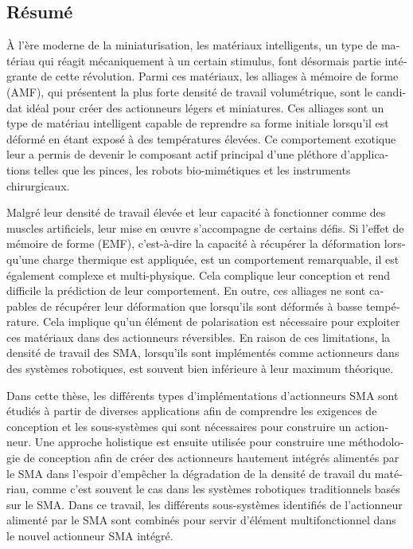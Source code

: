 \begin{otherlanguage}{french}
\cleardoublepage
\chapter*{Résumé}
À l'ère moderne de la miniaturisation, les matériaux intelligents, un type de matériau qui réagit mécaniquement à un certain stimulus, font désormais partie intégrante de cette révolution. Parmi ces matériaux, les alliages à mémoire de forme (AMF), qui présentent la plus forte densité de travail volumétrique, sont le candidat idéal pour créer des actionneurs légers et miniatures. Ces alliages sont un type de matériau intelligent capable de reprendre sa forme initiale lorsqu'il est déformé en étant exposé à des températures élevées. Ce comportement exotique leur a permis de devenir le composant actif principal d'une pléthore d'applications telles que les pinces, les robots bio-mimétiques et les instruments chirurgicaux.

Malgré leur densité de travail élevée et leur capacité à fonctionner comme des muscles artificiels, leur mise en œuvre s'accompagne de certains défis. Si l'effet de mémoire de forme (EMF), c'est-à-dire la capacité à récupérer la déformation lorsqu'une charge thermique est appliquée, est un comportement remarquable, il est également complexe et multi-physique. Cela complique leur conception et rend difficile la prédiction de leur comportement. En outre, ces alliages ne sont capables de récupérer leur déformation que lorsqu'ils sont déformés à basse température. Cela implique qu'un élément de polarisation est nécessaire pour exploiter ces matériaux dans des actionneurs réversibles. En raison de ces limitations, la densité de travail des SMA, lorsqu'ils sont implémentés comme actionneurs dans des systèmes robotiques, est souvent bien inférieure à leur maximum théorique.

Dans cette thèse, les différents types d'implémentations d'actionneurs SMA sont étudiés à partir de diverses applications afin de comprendre les exigences de conception et les sous-systèmes qui sont nécessaires pour construire un actionneur. Une approche holistique est ensuite utilisée pour construire une méthodologie de conception afin de créer des actionneurs hautement intégrés alimentés par le SMA dans l'espoir d'empêcher la dégradation de la densité de travail du matériau, comme c'est souvent le cas dans les systèmes robotiques traditionnels basés sur le SMA. Dans ce travail, les différents sous-systèmes identifiés de l'actionneur alimenté par le SMA sont combinés pour servir d'élément multifonctionnel dans le nouvel actionneur SMA intégré.


\end{otherlanguage}
